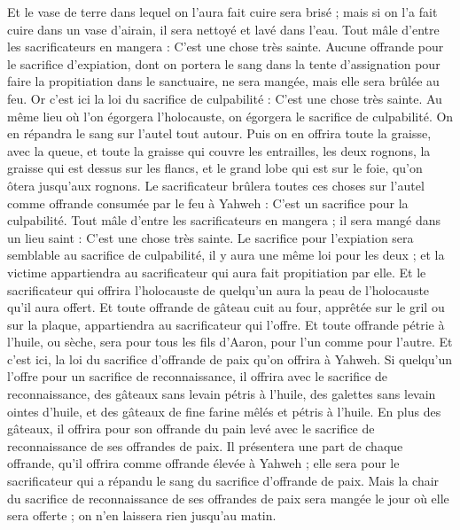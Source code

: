 \begin{multicols}{2}
Et le vase de terre dans lequel on l'aura fait cuire sera brisé ; mais si on l'a fait cuire dans un vase d'airain, il sera nettoyé et lavé dans l'eau.
Tout mâle d'entre les sacrificateurs en mangera : C'est une chose très sainte.
Aucune offrande pour le sacrifice d'expiation, dont on portera le sang dans la tente d'assignation pour faire la propitiation dans le sanctuaire, ne sera mangée, mais elle sera brûlée au feu.
\VerseOne{}Or c'est ici la loi du sacrifice de culpabilité : C'est une chose très sainte.
Au même lieu où l'on égorgera l'holocauste, on égorgera le sacrifice de culpabilité. On en répandra le sang sur l'autel tout autour.
Puis on en offrira toute la graisse, avec la queue, et toute la graisse qui couvre les entrailles,
les deux rognons, la graisse qui est dessus sur les flancs, et le grand lobe qui est sur le foie, qu'on ôtera jusqu'aux rognons.
Le sacrificateur brûlera toutes ces choses sur l'autel comme offrande consumée par le feu à Yahweh : C'est un sacrifice pour la culpabilité.
Tout mâle d'entre les sacrificateurs en mangera ; il sera mangé dans un lieu saint : C'est une chose très sainte.
Le sacrifice pour l'expiation sera semblable au sacrifice de culpabilité, il y aura une même loi pour les deux ; et la victime appartiendra au sacrificateur qui aura fait propitiation par elle.
Et le sacrificateur qui offrira l'holocauste de quelqu'un aura la peau de l'holocauste qu'il aura offert.
Et toute offrande de gâteau cuit au four, apprêtée sur le gril ou sur la plaque, appartiendra au sacrificateur qui l'offre.
Et toute offrande pétrie à l'huile, ou sèche, sera pour tous les fils d'Aaron, pour l'un comme pour l'autre.
Et c'est ici, la loi du sacrifice d'offrande de paix qu'on offrira à Yahweh.
Si quelqu'un l'offre pour un sacrifice de reconnaissance, il offrira avec le sacrifice de reconnaissance, des gâteaux sans levain pétris à l'huile, des galettes sans levain ointes d'huile, et des gâteaux de fine farine mêlés et pétris à l'huile.
En plus des gâteaux, il offrira pour son offrande du pain levé avec le sacrifice de reconnaissance de ses offrandes de paix.
Il présentera une part de chaque offrande, qu'il offrira comme offrande élevée à Yahweh ; elle sera pour le sacrificateur qui a répandu le sang du sacrifice d'offrande de paix.
Mais la chair du sacrifice de reconnaissance de ses offrandes de paix sera mangée le jour où elle sera offerte ; on n'en laissera rien jusqu'au matin.

\end{multicols}
